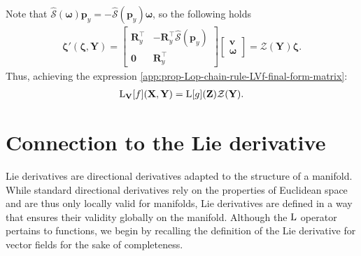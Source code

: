 Note that $\widehat{\mathcal{S}}(\boldsymbol{\omega})\mathbf{p}_y = -\widehat{\mathcal{S}}(\mathbf{p}_y)\boldsymbol{\omega}$, so the following holds
\begin{align}
    \boldsymbol{\zeta}'(\boldsymbol{\zeta}, \mathbf{Y}) = \begin{bmatrix}
        \mathbf{R}_y^\top & -\mathbf{R}_y^\top\widehat{\mathcal{S}}(\mathbf{p}_y)\\
        \mathbf{0} & \mathbf{R}_y^\top
    \end{bmatrix}\begin{bmatrix}
        \mathbf{v}\\ \boldsymbol{\omega}
    \end{bmatrix}
    = \mathcal{Z}(\mathbf{Y})\boldsymbol{\zeta}.
\end{align}
Thus, achieving the expression \eqref{app:prop-Lop-chain-rule-LVf-final-form-matrix}:
\begin{align}
    \operatorname{L}_\mathbf{V}[f](\mathbf{X}, \mathbf{Y}) = \operatorname{L}[g](\mathbf{Z})\mathcal{Z}(\mathbf{Y}). \label{eq:appendix-prop-Lop-chain-rule-SE3}
\end{align}

\section{Connection to the Lie derivative}\label{app:Lop-and-Lie-derivative}
Lie derivatives are directional derivatives adapted to the structure of a manifold. While standard directional derivatives rely on the properties of Euclidean space and are thus only locally valid for manifolds, Lie derivatives are defined in a way that ensures their validity globally on the manifold. Although the $\operatorname{L}$ operator pertains to functions, we begin by recalling the definition of the Lie derivative for vector fields for the sake of completeness.

